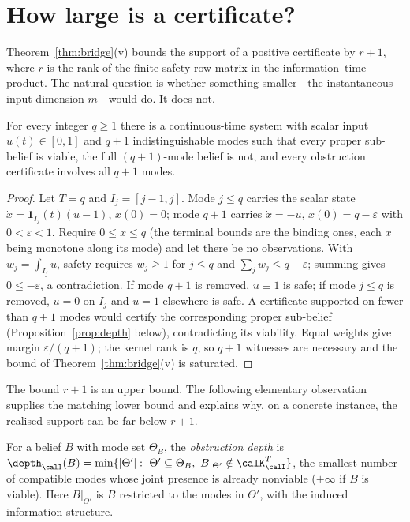 \section{How large is a certificate?}\label{sec:size}

Theorem~\ref{thm:bridge}(v) bounds the support of a positive certificate by $r+1$, where $r$ is the rank of the finite safety-row matrix in the information--time product. The natural question is whether something smaller---the instantaneous input dimension $m$---would do. It does not.

\begin{proposition}\label{prop:rank}
For every integer $q\ge1$ there is a continuous-time system with scalar input $u(t)\in[0,1]$ and $q+1$ indistinguishable modes such that every proper sub-belief is viable, the full $(q{+}1)$-mode belief is not, and every obstruction certificate involves all $q+1$ modes.
\end{proposition}

\begin{proof}
Let $T=q$ and $I_j=[j-1,j]$. Mode $j\le q$ carries the scalar state $\dot x=\mathbf 1_{I_j}(t)(u-1)$, $x(0)=0$; mode $q+1$ carries $\dot x=-u$, $x(0)=q-\varepsilon$ with $0<\varepsilon<1$. Require $0\le x\le q$ (the terminal bounds are the binding ones, each $x$ being monotone along its mode) and let there be no observations. With $w_j=\int_{I_j}u$, safety requires $w_j\ge1$ for $j\le q$ and $\sum_jw_j\le q-\varepsilon$; summing gives $0\le-\varepsilon$, a contradiction. If mode $q+1$ is removed, $u\equiv1$ is safe; if mode $j\le q$ is removed, $u=0$ on $I_j$ and $u=1$ elsewhere is safe. A certificate supported on fewer than $q+1$ modes would certify the corresponding proper sub-belief (Proposition~\ref{prop:depth} below), contradicting its viability. Equal weights give margin $\varepsilon/(q+1)$; the kernel rank is $q$, so $q+1$ witnesses are necessary and the bound of Theorem~\ref{thm:bridge}(v) is saturated.
\end{proof}

The bound $r+1$ is an upper bound. The following elementary observation supplies the matching lower bound and explains why, on a concrete instance, the realised support can be far below $r+1$.

\begin{definition}\label{def:depth}
For a belief $B$ with mode set $\Theta_B$, the \emph{obstruction depth} is
$\depth_\calI(B)=\min\{|\Theta'|:\ \Theta'\subseteq\Theta_B,\ B|_{\Theta'}\notin\calK^T_\calI\}$, the smallest number of compatible modes whose joint presence is already nonviable ($+\infty$ if $B$ is viable). Here $B|_{\Theta'}$ is $B$ restricted to the modes in $\Theta'$, with the induced information structure.
\end{definition}

